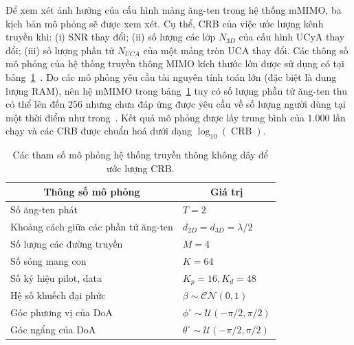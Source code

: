 Để xem xét ảnh hưởng của cấu hình mảng ăng-ten trong hệ thống mMIMO, ba kịch bản mô phỏng sẽ được xem xét. Cụ thể, CRB của việc ước lượng kênh truyền khi: (i) SNR thay đổi; (ii) số lượng các lớp $N_{3D}$ của cấu hình UCyA thay đổi; (iii) số lượng phần tử $N_{UCA}$ của một mảng tròn UCA thay đổi. Các thông số mô phỏng của hệ thống truyền thông MIMO kích thước lớn được sử dụng có tại bảng~\ref{tab:simulation_param_CRB}~\cite{Swindlehurst2022}. Do các mô phỏng yêu cầu tài nguyên tính toán lớn (đặc biệt là dung lượng RAM), nên hệ mMIMO trong bảng~\ref{tab:simulation_param_CRB} tuy có số lượng phần tử ăng-ten thu có thể lên đến $256$ nhưng chưa đáp ứng được yêu cầu về số lượng người dùng tại một thời điểm như trong~\cite{Larsson2014}. Kết quả mô phỏng được lấy trung bình của $1.000$ lần chạy và các CRB được chuẩn hoá dưới dạng $\log_{10} (\operatorname{CRB})$.
\begin{table}[ht]
\centering
\caption{Các tham số mô phỏng hệ thống truyền thông không dây để ước lượng CRB.}
\label{tab:simulation_param_CRB}
\begin{tabular}{p{8cm} | p{6cm}}
\hline
\hline
\multicolumn{1}{c|}{\textbf{Thông số mô phỏng}} & \multicolumn{1}{c}{\textbf{Giá trị}} \\ \hline
Số ăng-ten phát                            & $T = 2$      \\ \hline
Khoảng cách giữa các phần tử ăng-ten                 & $d_{2D} = d_{3D} = \lambda / 2$ \\ \hline
Số lượng các đường truyền                   & $M = 4$      \\ \hline
Số sóng mang con                    & $K = 64$     \\ \hline
Số ký hiệu pilot, data                          & $K_p = 16, K_d = 48$     \\ \hline
Hệ số khuếch đại phức               & $\beta \sim \mathcal{C} \mathcal{N}\left(0, 1 \right)$     \\ \hline
Góc phương vị của DoA            & $\phi^\circ \sim \mathcal{U}(-\pi/2, \pi/2)$        \\ \hline
Góc ngẩng của DoA           & $\theta^\circ \sim \mathcal{U}(-\pi/2, \pi/2)$       \\ \hline
\end{tabular}
\end{table}
